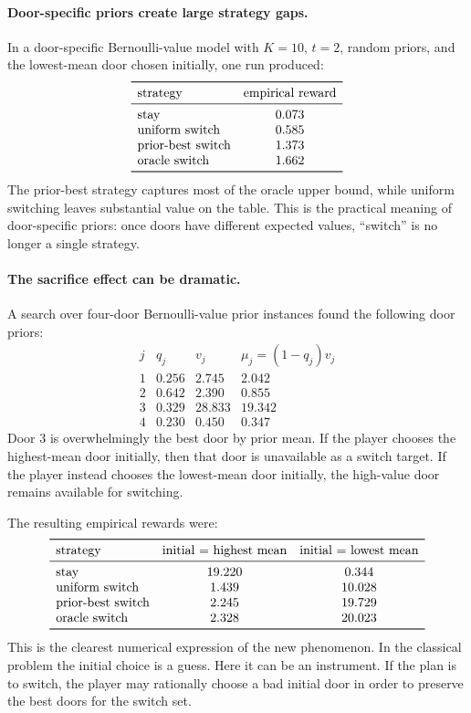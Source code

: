 \documentclass[11pt]{article}
\begin{document}
\paragraph{Door-specific priors create large strategy gaps.}
In a door-specific Bernoulli-value model with $K=10$, $t=2$, random priors, and
the lowest-mean door chosen initially, one run produced:
\[
\begin{array}{lc}
\toprule
\text{strategy} & \text{empirical reward}\\
\midrule
\text{stay} & 0.073\\
\text{uniform switch} & 0.585\\
\text{prior-best switch} & 1.373\\
\text{oracle switch} & 1.662\\
\bottomrule
\end{array}
\]
The prior-best strategy captures most of the oracle upper bound, while uniform
switching leaves substantial value on the table.  This is the practical
meaning of door-specific priors: once doors have different expected values,
``switch'' is no longer a single strategy.

\paragraph{The sacrifice effect can be dramatic.}
A search over four-door Bernoulli-value prior instances found the following
door priors:
\[
\begin{array}{c|ccc}
j & q_j & v_j & \mu_j=(1-q_j)v_j\\
\hline
1 & 0.256 & 2.745 & 2.042\\
2 & 0.642 & 2.390 & 0.855\\
3 & 0.329 & 28.833 & 19.342\\
4 & 0.230 & 0.450 & 0.347
\end{array}
\]
Door 3 is overwhelmingly the best door by prior mean.  If the player chooses
the highest-mean door initially, then that door is unavailable as a switch
target.  If the player instead chooses the lowest-mean door initially, the
high-value door remains available for switching.

The resulting empirical rewards were:
\[
\begin{array}{lcc}
\toprule
\text{strategy} & \text{initial = highest mean} & \text{initial = lowest mean}\\
\midrule
\text{stay} & 19.220 & 0.344\\
\text{uniform switch} & 1.439 & 10.028\\
\text{prior-best switch} & 2.245 & 19.729\\
\text{oracle switch} & 2.328 & 20.023\\
\bottomrule
\end{array}
\]
This is the clearest numerical expression of the new phenomenon.  In the
classical problem the initial choice is a guess.  Here it can be an
instrument.  If the plan is to switch, the player may rationally choose a bad
initial door in order to preserve the best doors for the switch set.
\end{document}
